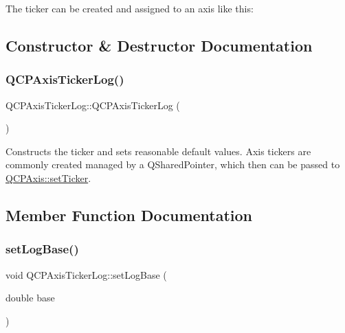 The ticker can be created and assigned to an axis like this\+: 
\begin{DoxyCodeInclude}
\end{DoxyCodeInclude}


\subsection{Constructor \& Destructor Documentation}
\mbox{\label{classQCPAxisTickerLog_af3cb86ea5eef2023c0b96b5260c4cbdf}} 
\subsubsection{\texorpdfstring{Q\+C\+P\+Axis\+Ticker\+Log()}{QCPAxisTickerLog()}}
{\footnotesize\ttfamily Q\+C\+P\+Axis\+Ticker\+Log\+::\+Q\+C\+P\+Axis\+Ticker\+Log (\begin{DoxyParamCaption}{ }\end{DoxyParamCaption})}

Constructs the ticker and sets reasonable default values. Axis tickers are commonly created managed by a Q\+Shared\+Pointer, which then can be passed to \hyperlink{classQCPAxis_a4ee03fcd2c74d05cd1a419b9af5cfbdc}{Q\+C\+P\+Axis\+::set\+Ticker}. 

\subsection{Member Function Documentation}
\mbox{\label{classQCPAxisTickerLog_ac6e3b4e03baea3816f898869ab9751ef}} 
\subsubsection{\texorpdfstring{set\+Log\+Base()}{setLogBase()}}
{\footnotesize\ttfamily void Q\+C\+P\+Axis\+Ticker\+Log\+::set\+Log\+Base (\begin{DoxyParamCaption}\item[{double}]{base }\end{DoxyParamCaption})}

